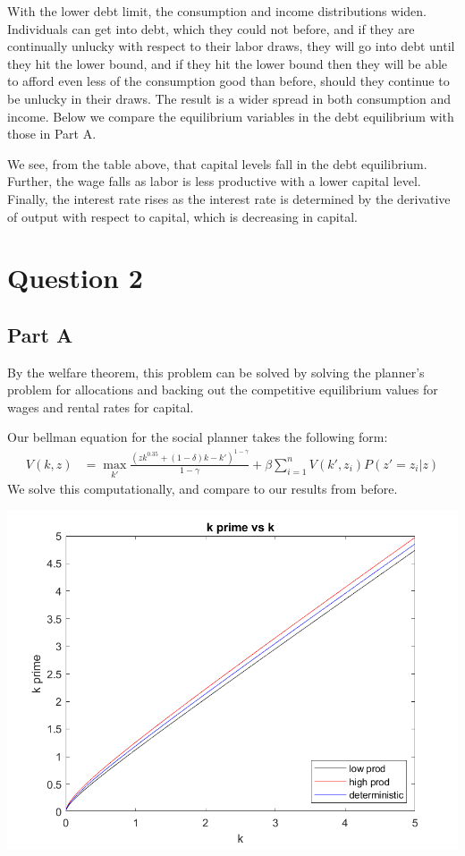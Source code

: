 \documentclass[11pt]{article} %
\begin{document}
With the lower debt limit, the consumption and income distributions widen. Individuals can get into debt, which they could not before, and if they are continually unlucky with respect to their labor draws, they will go into debt until they hit the lower bound, and if they hit the lower bound then they will be able to afford even less of the consumption good than before, should they continue to be unlucky in their draws. The result is a wider spread in both consumption and income. Below we compare the equilibrium variables in the debt equilibrium with those in Part A.

\begin{center}

\end{center}

We see, from the table above, that capital levels fall in the debt equilibrium. Further, the wage falls as labor is less productive with a lower capital level. Finally, the interest rate rises as the interest rate is determined by the derivative of output with respect to capital, which is decreasing in capital.

\section{Question 2}
\subsection{Part A}
By the welfare theorem, this problem can be solved by solving the planner's problem for allocations and backing out the competitive equilibrium values for wages and rental rates for capital.

Our bellman equation for the social planner takes the following form:
\begin{align*}
V(k,z) &= \max_{k'} \frac{(zk^{0.35}+(1-\delta)k - k')^{1-\gamma}}{1-\gamma} + \beta\sum_{i=1}^n V(k',z_i)P(z' = z_i|z)
\end{align*}
 We solve this computationally, and compare to our results from before.

\includegraphics{q2k}
\end{document}
